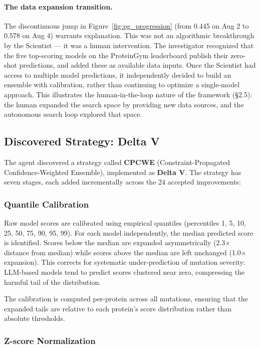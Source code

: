 \documentclass[11pt,a4paper]{article}
\begin{document}
\paragraph{The data expansion transition.}
The discontinuous jump in Figure~\ref{fig:pg_progression} (from 0.445 on Aug 2 to 0.578 on Aug 4) warrants explanation. This was not an algorithmic breakthrough by the Scientist --- it was a human intervention. The investigator recognized that the five top-scoring models on the ProteinGym leaderboard publish their zero-shot predictions, and added these as available data inputs. Once the Scientist had access to multiple model predictions, it independently decided to build an ensemble with calibration, rather than continuing to optimize a single-model approach. This illustrates the human-in-the-loop nature of the framework (\S2.5): the human expanded the search space by providing new data sources, and the autonomous search loop explored that space.

\subsection{Discovered Strategy: Delta V}

The agent discovered a strategy called \textbf{CPCWE} (Constraint-Propagated Confidence-Weighted Ensemble), implemented as \textbf{Delta V}. The strategy has seven stages, each added incrementally across the 24 accepted improvements:

\subsubsection{Quantile Calibration}

Raw model scores are calibrated using empirical quantiles (percentiles 1, 5, 10, 25, 50, 75, 90, 95, 99). For each model independently, the median predicted score is identified. Scores below the median are expanded asymmetrically (2.3$\times$ distance from median) while scores above the median are left unchanged (1.0$\times$ expansion). This corrects for systematic under-prediction of mutation severity: LLM-based models tend to predict scores clustered near zero, compressing the harmful tail of the distribution.

The calibration is computed per-protein across all mutations, ensuring that the expanded tails are relative to each protein's score distribution rather than absolute thresholds.

\subsubsection{Z-score Normalization}
\end{document}
